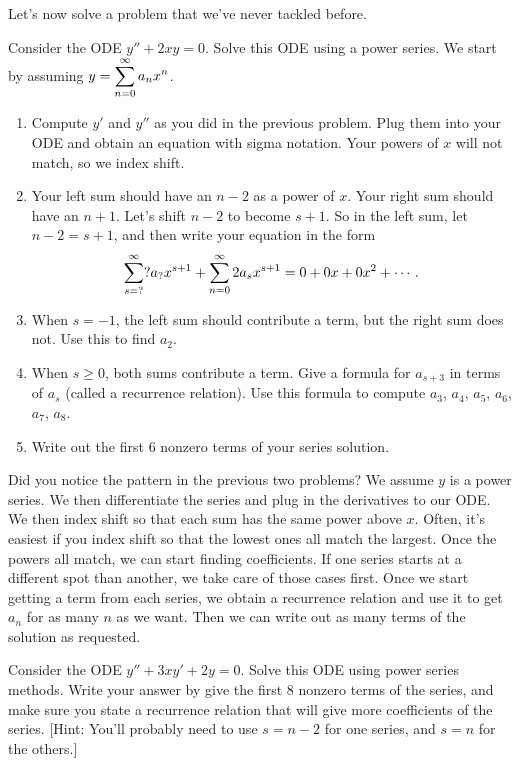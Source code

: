 Let's now solve a problem that we've never tackled before. 
\begin{problem}
 Consider the ODE $y''+2xy=0$.  Solve this ODE using a power series.  We start by assuming $\displaystyle y = \sum_{n=0}^\infty a_n x^n$.  
 \begin{enumerate}
  \item Compute $y'$ and $y''$ as you did in the previous problem.  Plug them into your ODE and obtain an equation with sigma notation. Your powers of $x$ will not match, so we index shift.
  \item Your left sum should have an $n-2$ as a power of $x$.  Your right sum should have an $n+1$.  Let's shift $n-2$ to become $s+1$. So in the left sum, let $n-2=s+1$, and then write your equation in the form 
  $$\sum_{s=?}^\infty ?a_?x^{s+1} + \displaystyle \sum_{n=0}^\infty 2a_s x^{s+1}=0+0x+0x^2+\cdots.$$
  \item When $s=-1$, the left sum should contribute a term, but the right sum does not.  Use this to find $a_2$.
  \item When $s\geq 0$, both sums contribute a term. Give a formula for $a_{s+3}$ in terms of $a_s$ (called a recurrence relation). Use this formula to compute $a_3$, $a_4$, $a_5$, $a_6$, $a_7$, $a_8$. 
  \item Write out the first 6 nonzero terms of your series solution.
 \end{enumerate}

\end{problem}


Did you notice the pattern in the previous two problems?  We assume $y$ is a power series.  We then differentiate the series and plug in the derivatives to our ODE.  We then index shift so that each sum has the same power above $x$. Often, it's easiest if you index shift so that the lowest ones all match the largest.  Once the powers all match, we can start finding coefficients.  If one series starts at a different spot than another, we take care of those cases first. Once we start getting a term from each series, we obtain a recurrence relation and use it to get $a_n$ for as many $n$ as we want.  Then we can write out as many terms of the solution as requested. 

\begin{problem}
 Consider the ODE $y''+3xy'+2y=0$. Solve this ODE using power series methods. Write your answer by give the first 8 nonzero terms of the series, and make sure you state a recurrence relation that will give more coefficients of the series.
[Hint:  You'll probably  need to use $s=n-2$ for one series, and $s=n$ for the others.]
\end{problem}

